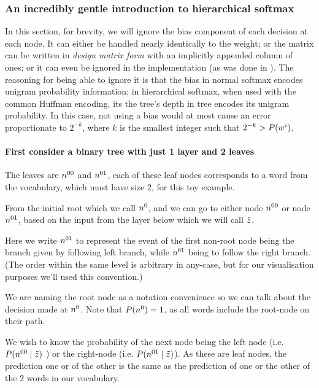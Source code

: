 \documentclass[parskip]{komatufte}
\begin{document}
\subsubsection{An incredibly gentle introduction to hierarchical softmax}
In this section, for brevity, we will ignore the bias component of each decision at each node.
It can either be handled nearly identically to the weight;
or the matrix can be written in \emph{design matrix form} with an implicitly appended column of ones;
or it can even be ignored in the implementation (as was done in \textcite{mikolov2013efficient}).
The reasoning for being able to ignore it is that the bias in normal softmax encodes unigram probability information;
in hierarchical softmax, when used with the common Huffman encoding, its the tree's depth in tree encodes its unigram probability. In this case, not using a bias would at most cause an error proportionate to $2^{-k}$, where $k$ is the smallest integer such that $2^{-k}>P(\n w_i)$.


\paragraph{First consider a binary tree with just 1 layer and 2 leaves}
The leaves are $\n n_{00}$ and $\n n_{01}$, each of these leaf nodes corresponds to a word from the vocabulary, which must have size 2, for this toy example.

	
From the initial root which we call $\n n_{0}$, and we can go to
either node $\n n_{00}$ or node $\n n_{01}$, based on the input from the
layer below which we will call $\tilde{z}$.


Here we write $\n n_{01}$ to represent the event of the first non-root
node being the branch given by following left branch, while $\n n_{01}$
being to follow the right branch.
(The order within the same level is arbitrary in any-case, but for our visualisation purposes we'll used this convention.) 

We are naming the root node as a notation convenience so we can talk
about the decision made at $\n n_{0}$. 
Note that $P(\n n_{0})=1$, as all words include the root-node on their path.

We wish to know the probability of the next node being the left node (i.e.
$P(\n n_{00}\mid \v z)$ ) or the right-node (i.e. $P(\n n_{01}\mid \v z)$).
As these are leaf nodes, the prediction one or of the other is the same as the prediction of one or the other of the 2 words in our vocabulary.
\end{document}
